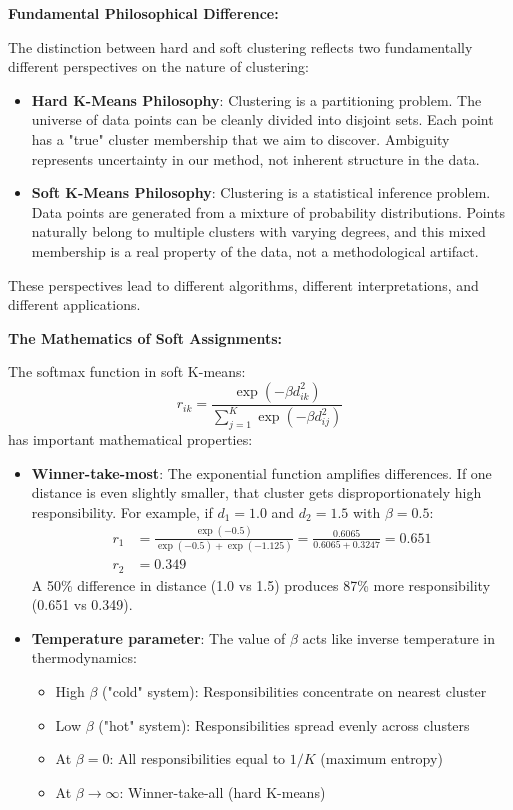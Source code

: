 \documentclass[12pt]{article}
\begin{document}
\begin{explanation}

\textbf{Fundamental Philosophical Difference:}

The distinction between hard and soft clustering reflects two fundamentally different perspectives on the nature of clustering:

\begin{itemize}
    \item \textbf{Hard K-Means Philosophy}: Clustering is a partitioning problem. The universe of data points can be cleanly divided into disjoint sets. Each point has a "true" cluster membership that we aim to discover. Ambiguity represents uncertainty in our method, not inherent structure in the data.

    \item \textbf{Soft K-Means Philosophy}: Clustering is a statistical inference problem. Data points are generated from a mixture of probability distributions. Points naturally belong to multiple clusters with varying degrees, and this mixed membership is a real property of the data, not a methodological artifact.
\end{itemize}

These perspectives lead to different algorithms, different interpretations, and different applications.

\textbf{The Mathematics of Soft Assignments:}

The softmax function in soft K-means:
\[
r_{ik} = \frac{\exp(-\beta d_{ik}^2)}{\sum_{j=1}^K \exp(-\beta d_{ij}^2)}
\]
has important mathematical properties:

\begin{itemize}
    \item \textbf{Winner-take-most}: The exponential function amplifies differences. If one distance is even slightly smaller, that cluster gets disproportionately high responsibility. For example, if $d_1 = 1.0$ and $d_2 = 1.5$ with $\beta = 0.5$:
    \begin{align*}
    r_1 &= \frac{\exp(-0.5)}{\exp(-0.5) + \exp(-1.125)} = \frac{0.6065}{0.6065 + 0.3247} = 0.651 \\
    r_2 &= 0.349
    \end{align*}
    A 50\% difference in distance (1.0 vs 1.5) produces 87\% more responsibility (0.651 vs 0.349).

    \item \textbf{Temperature parameter}: The value of $\beta$ acts like inverse temperature in thermodynamics:
    \begin{itemize}
        \item High $\beta$ ("cold" system): Responsibilities concentrate on nearest cluster
        \item Low $\beta$ ("hot" system): Responsibilities spread evenly across clusters
        \item At $\beta = 0$: All responsibilities equal to $1/K$ (maximum entropy)
        \item At $\beta \to \infty$: Winner-take-all (hard K-means)
    \end{itemize}


\end{itemize}
\end{explanation}
\end{document}
